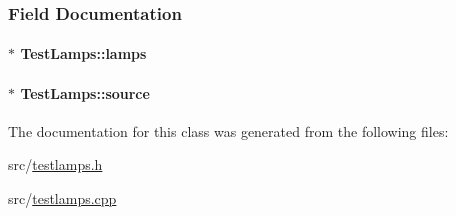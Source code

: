 \subsubsection{\-Field \-Documentation}
\hypertarget{classTestLamps_a09fec794f7adfa7e7e3f29dd74e03b2d}{
\paragraph[{lamps}]{$\ast$ {\bf \-Test\-Lamps\-::lamps}}}\label{classTestLamps_a09fec794f7adfa7e7e3f29dd74e03b2d}
\hypertarget{classTestLamps_ad48820948ab9c2ac12de569a65145d58}{
\paragraph[{source}]{$\ast$ {\bf \-Test\-Lamps\-::source}}}\label{classTestLamps_ad48820948ab9c2ac12de569a65145d58}


\-The documentation for this class was generated from the following files\-:\begin{DoxyCompactItemize}
\item 
src/\hyperlink{testlamps_8h}{testlamps.\-h}\item 
src/\hyperlink{testlamps_8cpp}{testlamps.\-cpp}\end{DoxyCompactItemize}
